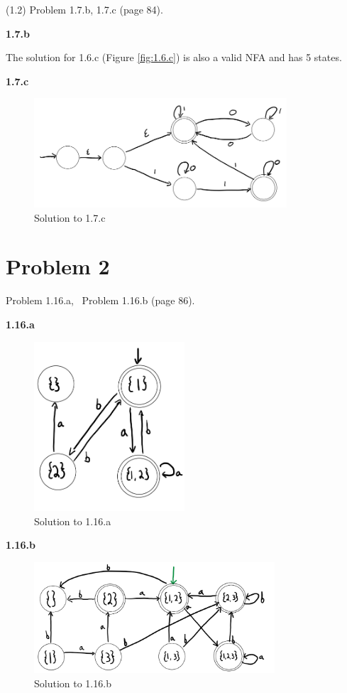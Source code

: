\documentclass[11pt]{article}
\begin{document}
\noindent
(1.2) Problem 1.7.b, 1.7.c (page 84).
\newline

\textbf{1.7.b}

The solution for 1.6.c (Figure \ref{fig:1.6.c}) is also a valid NFA and has 5 states.

\textbf{1.7.c}
  \begin{figure}[H]
     \centering
     \includegraphics[width = 0.84\textwidth]{17c_CSCI338.PNG}
     \caption{Solution to 1.7.c}
     \label{fig:1.7.c}
 \end{figure}


\newpage
\section*{Problem 2}

Problem 1.16.a, ~Problem 1.16.b (page 86).
\newline

\textbf{1.16.a}
\begin{figure}[H]
     \centering
     \includegraphics[width = 0.5\textwidth]{1_16a_CSCI338.PNG}
     \caption{Solution to 1.16.a}
     \label{fig:1.16.a}
 \end{figure}  
 
 
\textbf{1.16.b}
\begin{figure}[H]
     \centering
     \includegraphics[width = 0.8\textwidth]{1_16b_CSCI338.PNG}
     \caption{Solution to 1.16.b}
     \label{fig:1.16.b}
 \end{figure}
\end{document}
